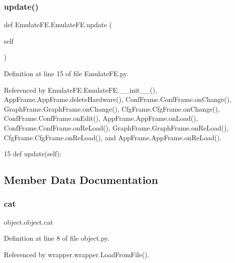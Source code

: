 \subsubsection{\texorpdfstring{update()}{update()}}
{\footnotesize\ttfamily def Emulate\+F\+E.\+Emulate\+F\+E.\+update (\begin{DoxyParamCaption}\item[{}]{self }\end{DoxyParamCaption})}



Definition at line 15 of file Emulate\+F\+E.\+py.



Referenced by Emulate\+F\+E.\+Emulate\+F\+E.\+\_\+\+\_\+init\+\_\+\+\_\+(), App\+Frame.\+App\+Frame.\+delete\+Hardware(), Conf\+Frame.\+Conf\+Frame.\+on\+Change(), Graph\+Frame.\+Graph\+Frame.\+on\+Change(), Cfg\+Frame.\+Cfg\+Frame.\+on\+Change(), Conf\+Frame.\+Conf\+Frame.\+on\+Edit(), App\+Frame.\+App\+Frame.\+on\+Load(), Conf\+Frame.\+Conf\+Frame.\+on\+Re\+Load(), Graph\+Frame.\+Graph\+Frame.\+on\+Re\+Load(), Cfg\+Frame.\+Cfg\+Frame.\+on\+Re\+Load(), and App\+Frame.\+App\+Frame.\+on\+Re\+Load().


\begin{DoxyCode}
15     \textcolor{keyword}{def }update(self):
\end{DoxyCode}


\subsection{Member Data Documentation}
\mbox{\label{classobject_1_1object_af114388a80cca208c152ffeca0e89e23}} 
\subsubsection{\texorpdfstring{cat}{cat}}
{\footnotesize\ttfamily object.\+object.\+cat\hspace{0.3cm}{\ttfamily [inherited]}}



Definition at line 8 of file object.\+py.



Referenced by wrapper.\+wrapper.\+Load\+From\+File().

\mbox{\label{classobject_1_1object_a82b61e7cd7e18b1f9de10fc832e5b75e}} 
